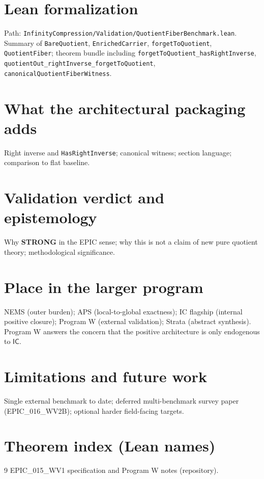\documentclass[11pt]{article}
\newcommand{\IC}{\ensuremath{\mathsf{IC}}}
\begin{document}
\section{Lean formalization}
Path: \texttt{InfinityCompression/Validation/QuotientFiberBenchmark.lean}. Summary of \texttt{BareQuotient}, \texttt{EnrichedCarrier}, \texttt{forgetToQuotient}, \texttt{QuotientFiber}; theorem bundle including \texttt{forgetToQuotient\_hasRightInverse}, \texttt{quotientOut\_rightInverse\_forgetToQuotient}, \texttt{canonicalQuotientFiberWitness}.

\section{What the architectural packaging adds}
Right inverse and \texttt{HasRightInverse}; canonical witness; section language; comparison to flat baseline.

\section{Validation verdict and epistemology}
Why \textbf{STRONG} in the EPIC sense; why this is not a claim of new pure quotient theory; methodological significance.

\section{Place in the larger program}
NEMS (outer burden); APS (local-to-global exactness); IC flagship (internal positive closure); Program W (external validation); Strata (abstract synthesis). Program W answers the concern that the positive architecture is only endogenous to \IC{}.

\section{Limitations and future work}
Single external benchmark to date; deferred multi-benchmark survey paper (EPIC\_016\_WV2B); optional harder field-facing targets.

\appendix
\section{Theorem index (Lean names)}

\begin{thebibliography}{9}
 EPIC\_015\_WV1 specification and Program W notes (repository).
\end{thebibliography}
\end{document}
